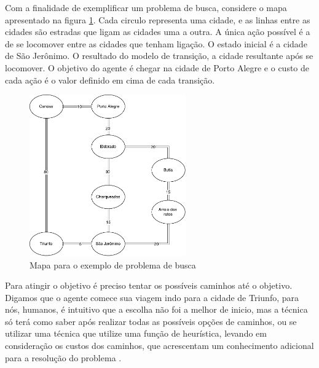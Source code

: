 
Com a finalidade de exemplificar um problema de busca, considere o mapa apresentado na figura \ref{fig:mapabusca}. Cada circulo representa uma cidade, e as linhas entre as cidades são estradas que ligam as cidades uma a outra. A única ação possível é a de se locomover entre as cidades que tenham ligação. O estado inicial é a cidade de São Jerônimo. O resultado do modelo de transição, a cidade resultante após se locomover. O objetivo do agente é chegar na cidade de Porto Alegre e o custo de cada ação é o valor definido em cima de cada transição. 

\begin{figure}[ht]
	\centering
	\includegraphics[width=0.6\textwidth]{fig/mapabusca.pdf}
	\caption{Mapa para o exemplo de problema de busca}
	\label{fig:mapabusca}
\end{figure} 

Para atingir o objetivo é preciso tentar os possíveis caminhos até o objetivo. Digamos que o agente comece sua viagem indo para a cidade de Triunfo, para nós, humanos, é intuitivo que a escolha não foi a melhor de inicio, mas a técnica só terá como saber após realizar todas as possíveis opções de caminhos, ou se utilizar uma técnica que utilize uma função de heurística, levando em consideração os custos dos caminhos, que acrescentam um conhecimento adicional para a resolução do problema \cite{intelligence2003modern}.

